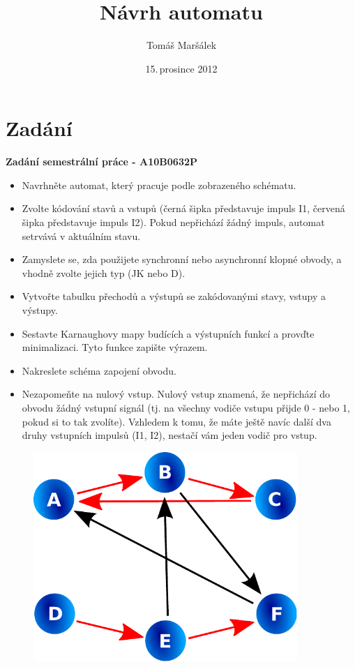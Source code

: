 \documentclass[titlepage]{article}
\title{Návrh automatu}
\author{Tomáš Maršálek}
\date{15.\,prosince 2012}
\begin{document}
\maketitle
\section{Zadání}
\large{\textbf{Zadání semestrální práce - A10B0632P}}
\begin{itemize}
	\item Navrhněte automat, který pracuje podle zobrazeného schématu.
	\item Zvolte kódování stavů a vstupů (černá šipka představuje impuls I1,
červená šipka představuje impuls I2). Pokud nepřichází žádný impuls, automat
setrvává v aktuálním stavu.
	\item Zamyslete se, zda použijete synchronní nebo asynchronní klopné
obvody, a vhodně zvolte jejich typ (JK nebo D).
	\item Vytvořte tabulku přechodů a výstupů se zakódovanými stavy, vstupy a
výstupy.
	\item Sestavte Karnaughovy mapy budících a výstupních funkcí a provďte
minimalizaci. Tyto funkce zapište výrazem.
	\item Nakreslete schéma zapojení obvodu.
	\item Nezapomeňte na nulový vstup. Nulový vstup znamená, že nepřichází do
obvodu žádný vstupní signál (tj. na všechny vodiče vstupu přijde 0 - nebo 1,
pokud si to tak zvolíte). Vzhledem k tomu, že máte ještě navíc další dva druhy
vstupních impulsů (I1, I2), nestačí vám jeden vodič pro vstup.
\end{itemize}

\begin{figure}[ht!]
\centering
\includegraphics[width=10cm]{graf.pdf}
\end{figure}
\clearpage
\end{document}
